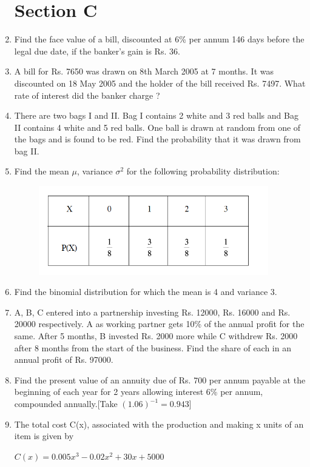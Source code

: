 \documentclass[journal,12pt,twocolumn]{IEEEtran}
\begin{document}
\begin{enumerate}
\section{Section C}
\item Find the face value of a bill, discounted at 6\% per annum 146 days before the legal due date, if the banker's gain is Rs. 36.
\item A bill for Rs. 7650 was drawn on 8th March 2005 at 7 months. It was discounted on 18 May 2005 and the holder of the bill received Rs. 7497. What rate of interest did the banker charge ?
\item There are two bags I and II. Bag I contains 2 white and 3 red balls and Bag II contains 4 white and 5 red balls. One ball is drawn at random from one of the bags and is found to be red. Find the probability that it was drawn from bag II.
\item Find the mean $\mu$, variance $\sigma^2$ for the following probability distribution:
\begin{figure}[H]
   \centering
   \includegraphics[width=10cm]{2.png}
\end{figure}
\item Find the binomial distribution for which the mean is 4 and variance 3.
\item A, B, C entered into a partnership investing Rs. 12000, Rs. 16000 and
Rs. 20000 respectively. A as working partner gets 10\% of the annual profit for
the same. After 5 months, B invested Rs. 2000 more while C withdrew Rs. 2000
after 8 months from the start of the business. Find the share of each in an
annual profit of Rs. 97000.
\item Find the present value of an annuity due of Rs. 700 per annum payable at the
beginning of each year for 2 years allowing interest 6\% per annum, compounded
annually.[Take $(1.06)^{-1} = 0.943$]
\item The total cost C(x), associated with the production and making x units of an item is given by
\begin{center}
   $C(x) = 0.005x^3 - 0.02x^2 + 30x + 5000 $ 
\end{center}

\end{enumerate}
\end{document}
